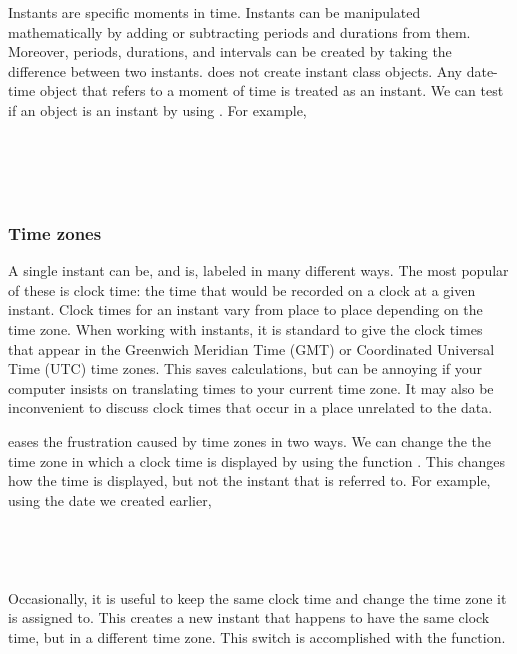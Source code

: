 \documentclass[article]{jss}
\begin{document}
Instants are specific moments in time. Instants can be manipulated mathematically by adding or subtracting periods and durations from them. Moreover, periods, durations, and intervals can be created by taking the difference between two instants.  does not create instant class objects. Any date-time object that refers to a moment of time is treated as an instant. We can test if an object is an instant by using . For example,\\

\\
\\

\\
\\

\subsubsection{Time zones}
\label{sec:tz}

A single instant can be, and is, labeled in many different ways.  The most popular of these is clock time: the time that would be recorded on a clock at a given instant. Clock times for an instant vary from place to place depending on the time zone. When working with instants, it is standard to give the clock times that appear in the Greenwich Meridian Time (GMT) or Coordinated Universal Time (UTC) time zones.  This saves calculations, but can be annoying if your computer insists on translating times to your current time zone.  It may also be inconvenient to discuss clock times that occur in a place unrelated to the data.

 eases the frustration caused by time zones in two ways. We can change the the time zone in which a clock time is displayed by using the function . This changes how the time is displayed, but not the instant that is referred to. For example, using the date we created earlier,\\

\\
\\
\\
\\

Occasionally, it is useful to keep the same clock time and change the time zone it is assigned to. This creates a new instant that happens to have the same clock time, but in a different time zone. This switch is accomplished with the  function.\\
\end{document}
